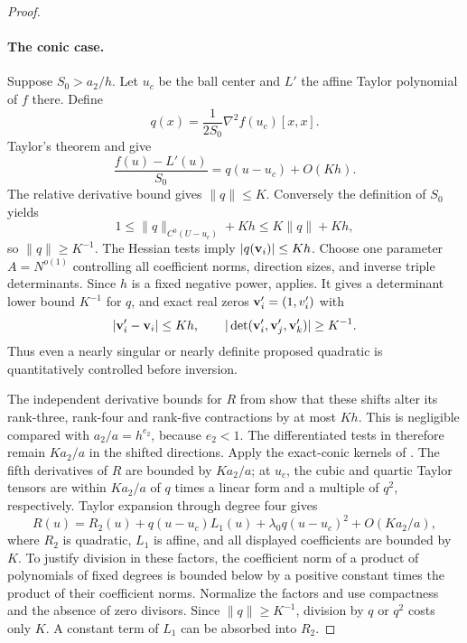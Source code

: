 \begin{proof}
\paragraph{The conic case.}
Suppose \(S_0>a_2/h\).
Let \(u_c\) be the ball center and \(L'\) the affine Taylor
polynomial of \(f\) there. Define
\[
 q(x)=\frac{1}{2S_0}\nabla^2f(u_c)[x,x].
\]
Taylor's theorem and  give
\begin{equation}\label{a05:f-conic}
 \frac{f(u)-L'(u)}{S_0}
       =q(u-u_c)+O(Kh).
\end{equation}
The relative derivative bound gives \(\|q\|\leq K\).
Conversely the definition of \(S_0\) yields
\[
 1\leq \|q\|_{C^0(U-u_c)}+Kh\leq K\|q\|+Kh,
\]
so \(\|q\|\geq K^{-1}\).
The Hessian tests imply \(|q({\bf v}_i)|\leq Kh\).
Choose one parameter \(A=N^{o(1)}\) controlling all coefficient
norms, direction sizes, and inverse triple determinants.
Since \(h\) is a fixed negative power, 
applies. It gives a determinant lower bound \(K^{-1}\) for
\(q\), and exact real zeros \({\bf v}'_i=(1,v_i')\) with
\[
 |{\bf v}'_i-{\bf v}_i|\leq Kh,
 \qquad
 |\det({\bf v}'_i,{\bf v}'_j,{\bf v}'_k)|\geq K^{-1}.
\]
Thus even a nearly singular or nearly definite proposed
quadratic is quantitatively controlled before inversion.

The independent derivative bounds for \(R\) from
 show that these shifts alter its
rank-three, rank-four and rank-five contractions by at most
\(Kh\). This is negligible compared with
\(a_2/a=h^{e_2}\), because \(e_2<1\).
The differentiated tests in  therefore
remain \(Ka_2/a\) in the shifted directions.
Apply the exact-conic kernels of .
The fifth derivatives of \(R\) are bounded by \(Ka_2/a\);
at \(u_c\), the cubic and quartic Taylor tensors are within
\(Ka_2/a\) of \(q\) times a linear form and a multiple of
\(q^2\), respectively. Taylor expansion through degree four gives
\begin{equation}\label{a05:R-restoration}
 R(u)=R_2(u)+q(u-u_c)L_1(u)
                +\lambda_0q(u-u_c)^2+O(Ka_2/a),
\end{equation}
where \(R_2\) is quadratic, \(L_1\) is affine, and all displayed
coefficients are bounded by \(K\).
To justify division in these factors, the coefficient norm of
a product of polynomials of fixed degrees is bounded below by
a positive constant times the product of their coefficient
norms. Normalize the factors and use compactness and the
absence of zero divisors. Since \(\|q\|\geq K^{-1}\), division
by \(q\) or \(q^2\) costs only \(K\).
A constant term of \(L_1\) can be absorbed into \(R_2\).


\end{proof}
